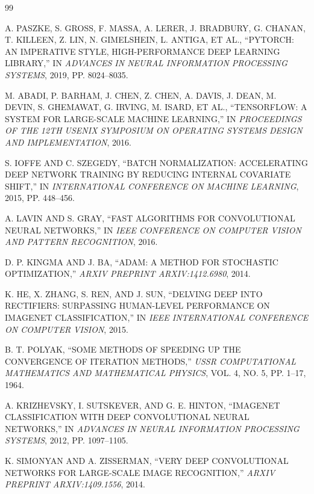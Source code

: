 \documentclass[12pt,oneside,a4paper]{report}
\begin{document}
\renewcommand{\bibname}{REFERENCES}
\begin{thebibliography}{99}

 A. PASZKE, S. GROSS, F. MASSA, A. LERER, J. BRADBURY, G. CHANAN, T. KILLEEN, Z. LIN, N. GIMELSHEIN, L. ANTIGA, ET AL., ``PYTORCH: AN IMPERATIVE STYLE, HIGH-PERFORMANCE DEEP LEARNING LIBRARY,'' IN \textit{ADVANCES IN NEURAL INFORMATION PROCESSING SYSTEMS}, 2019, PP. 8024--8035.

 M. ABADI, P. BARHAM, J. CHEN, Z. CHEN, A. DAVIS, J. DEAN, M. DEVIN, S. GHEMAWAT, G. IRVING, M. ISARD, ET AL., ``TENSORFLOW: A SYSTEM FOR LARGE-SCALE MACHINE LEARNING,'' IN \textit{PROCEEDINGS OF THE 12TH USENIX SYMPOSIUM ON OPERATING SYSTEMS DESIGN AND IMPLEMENTATION}, 2016.

 S. IOFFE AND C. SZEGEDY, ``BATCH NORMALIZATION: ACCELERATING DEEP NETWORK TRAINING BY REDUCING INTERNAL COVARIATE SHIFT,'' IN \textit{INTERNATIONAL CONFERENCE ON MACHINE LEARNING}, 2015, PP. 448--456.

 A. LAVIN AND S. GRAY, ``FAST ALGORITHMS FOR CONVOLUTIONAL NEURAL NETWORKS,'' IN \textit{IEEE CONFERENCE ON COMPUTER VISION AND PATTERN RECOGNITION}, 2016.

 D. P. KINGMA AND J. BA, ``ADAM: A METHOD FOR STOCHASTIC OPTIMIZATION,'' \textit{ARXIV PREPRINT ARXIV:1412.6980}, 2014.

 K. HE, X. ZHANG, S. REN, AND J. SUN, ``DELVING DEEP INTO RECTIFIERS: SURPASSING HUMAN-LEVEL PERFORMANCE ON IMAGENET CLASSIFICATION,'' IN \textit{IEEE INTERNATIONAL CONFERENCE ON COMPUTER VISION}, 2015.

 B. T. POLYAK, ``SOME METHODS OF SPEEDING UP THE CONVERGENCE OF ITERATION METHODS,'' \textit{USSR COMPUTATIONAL MATHEMATICS AND MATHEMATICAL PHYSICS}, VOL. 4, NO. 5, PP. 1--17, 1964.

 A. KRIZHEVSKY, I. SUTSKEVER, AND G. E. HINTON, ``IMAGENET CLASSIFICATION WITH DEEP CONVOLUTIONAL NEURAL NETWORKS,'' IN \textit{ADVANCES IN NEURAL INFORMATION PROCESSING SYSTEMS}, 2012, PP. 1097--1105.

 K. SIMONYAN AND A. ZISSERMAN, ``VERY DEEP CONVOLUTIONAL NETWORKS FOR LARGE-SCALE IMAGE RECOGNITION,'' \textit{ARXIV PREPRINT ARXIV:1409.1556}, 2014.


\end{thebibliography}
\end{document}
